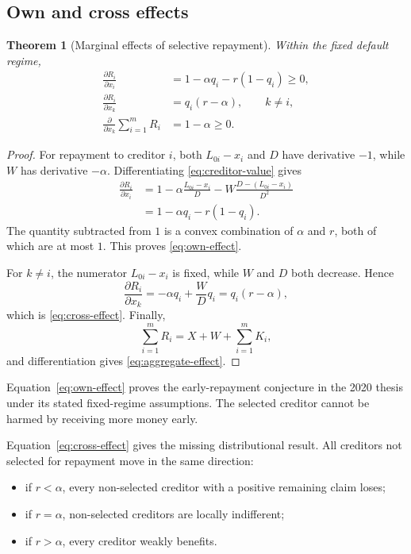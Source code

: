\documentclass[11pt]{article}
\newtheorem{theorem}{Theorem}[section]
\theoremstyle{definition}
\theoremstyle{remark}
\begin{document}
\subsection{Own and cross effects}

\begin{theorem}[Marginal effects of selective repayment]
Within the fixed default regime,
\begin{align}
  \frac{\partial R_i}{\partial x_i}
    &=1-\alpha q_i-r(1-q_i)\geq0,
      \label{eq:own-effect}\\
  \frac{\partial R_i}{\partial x_k}
    &=q_i(r-\alpha),
      \qquad k\neq i,
      \label{eq:cross-effect}\\
  \frac{\partial}{\partial x_k}\sum_{i=1}^m R_i
    &=1-\alpha\geq0.
      \label{eq:aggregate-effect}
\end{align}
\end{theorem}

\begin{proof}
For repayment to creditor $i$, both $L_{0i}-x_i$ and $D$ have derivative
$-1$, while $W$ has derivative $-\alpha$.  Differentiating
\eqref{eq:creditor-value} gives
\begin{align*}
  \frac{\partial R_i}{\partial x_i}
  &=1-\alpha\frac{L_{0i}-x_i}{D}
    -W\frac{D-(L_{0i}-x_i)}{D^2}\\
  &=1-\alpha q_i-r(1-q_i).
\end{align*}
The quantity subtracted from $1$ is a convex combination of $\alpha$ and
$r$, both of which are at most $1$.  This proves
\eqref{eq:own-effect}.

For $k\neq i$, the numerator $L_{0i}-x_i$ is fixed, while $W$ and $D$ both
decrease.  Hence
\begin{equation*}
  \frac{\partial R_i}{\partial x_k}
  =-\alpha q_i+\frac{W}{D}q_i=q_i(r-\alpha),
\end{equation*}
which is \eqref{eq:cross-effect}.  Finally,
\begin{equation}
  \sum_{i=1}^m R_i=X+W+\sum_{i=1}^m K_i,
\end{equation}
and differentiation gives \eqref{eq:aggregate-effect}.
\end{proof}

Equation~\eqref{eq:own-effect} proves the early-repayment conjecture in the
2020 thesis under its stated fixed-regime assumptions.  The selected creditor
cannot be harmed by receiving more money early.

Equation~\eqref{eq:cross-effect} gives the missing distributional result.
All creditors not selected for repayment move in the same direction:
\begin{itemize}
  \item if $r<\alpha$, every non-selected creditor with a positive remaining
  claim loses;
  \item if $r=\alpha$, non-selected creditors are locally indifferent;
  \item if $r>\alpha$, every creditor weakly benefits.
\end{itemize}
\end{document}
